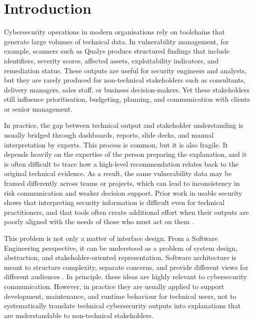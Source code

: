 \chapter{Introduction}\label{ch:introduction}

Cybersecurity operations in modern organisations rely on toolchains that generate large volumes of technical data. In vulnerability management, for example, scanners such as Qualys produce structured findings that include identifiers, severity scores, affected assets, exploitability indicators, and remediation status. These outputs are useful for security engineers and analysts, but they are rarely produced for non-technical stakeholders such as consultants, delivery managers, sales staff, or business decision-makers. Yet these stakeholders still influence prioritisation, budgeting, planning, and communication with clients or senior management.

In practice, the gap between technical output and stakeholder understanding is usually bridged through dashboards, reports, slide decks, and manual interpretation by experts. This process is common, but it is also fragile. It depends heavily on the expertise of the person preparing the explanation, and it is often difficult to trace how a high-level recommendation relates back to the original technical evidence. As a result, the same vulnerability data may be framed differently across teams or projects, which can lead to inconsistency in risk communication and weaker decision support. Prior work in usable security shows that interpreting security information is difficult even for technical practitioners, and that tools often create additional effort when their outputs are poorly aligned with the needs of those who must act on them \cite{werlinger2008ids, cranor2008framework}.

This problem is not only a matter of interface design. From a Software Engineering perspective, it can be understood as a problem of system design, abstraction, and stakeholder-oriented representation. Software architecture is meant to structure complexity, separate concerns, and provide different views for different audiences \cite{bass2012software, kruchten1995viewmodel, parnas1972modules}. In principle, these ideas are highly relevant to cybersecurity communication. However, in practice they are usually applied to support development, maintenance, and runtime behaviour for technical users, not to systematically translate technical cybersecurity outputs into explanations that are understandable to non-technical stakeholders.


